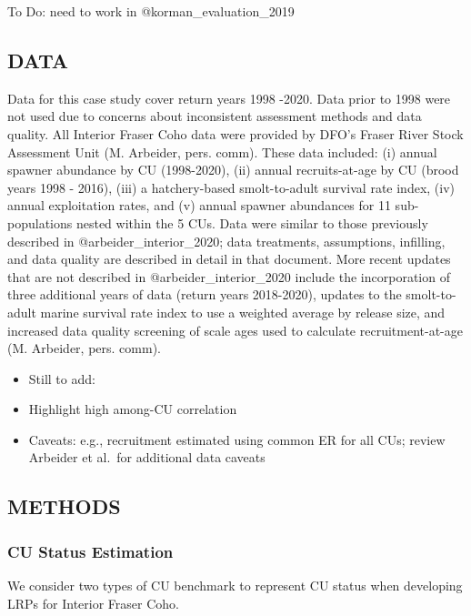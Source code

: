\documentclass[
]{article}
\providecommand{\tightlist}{%
  \setlength{\itemsep}{0pt}\setlength{\parskip}{0pt}}
\begin{document}
To Do: need to work in @korman\_evaluation\_2019

\hypertarget{data}{%
\subsection{DATA}\label{data}}

Data for this case study cover return years 1998 -2020. Data prior to
1998 were not used due to concerns about inconsistent assessment methods
and data quality. All Interior Fraser Coho data were provided by DFO's
Fraser River Stock Assessment Unit (M. Arbeider, pers. comm). These data
included: (i) annual spawner abundance by CU (1998-2020), (ii) annual
recruits-at-age by CU (brood years 1998 - 2016), (iii) a hatchery-based
smolt-to-adult survival rate index, (iv) annual exploitation rates, and
(v) annual spawner abundances for 11 sub-populations nested within the 5
CUs. Data were similar to those previously described in
@arbeider\_interior\_2020; data treatments, assumptions, infilling, and
data quality are described in detail in that document. More recent
updates that are not described in @arbeider\_interior\_2020 include the
incorporation of three additional years of data (return years
2018-2020), updates to the smolt-to-adult marine survival rate index to
use a weighted average by release size, and increased data quality
screening of scale ages used to calculate recruitment-at-age (M.
Arbeider, pers. comm).

\begin{itemize}
\tightlist
\item
  Still to add:
\item
  Highlight high among-CU correlation
\item
  Caveats: e.g., recruitment estimated using common ER for all CUs;
  review Arbeider et al.~for additional data caveats
\end{itemize}

\hypertarget{methods}{%
\subsection{METHODS}\label{methods}}

\hypertarget{cu-status-estimation}{%
\subsubsection{CU Status Estimation}\label{cu-status-estimation}}

We consider two types of CU benchmark to represent CU status when
developing LRPs for Interior Fraser Coho.
\end{document}
